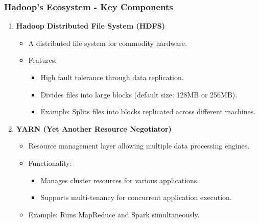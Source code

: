 \documentclass[aspectratio=169]{beamer}
\begin{document}
\begin{frame}[fragile]
    \frametitle{Hadoop's Ecosystem - Key Components}
    \begin{enumerate}
        \item \textbf{Hadoop Distributed File System (HDFS)}
        \begin{itemize}
            \item A distributed file system for commodity hardware.
            \item Features:
                \begin{itemize}
                    \item High fault tolerance through data replication.
                    \item Divides files into large blocks (default size: 128MB or 256MB).
                    \item Example: Splits files into blocks replicated across different machines.
                \end{itemize}
        \end{itemize}
        
        \item \textbf{YARN (Yet Another Resource Negotiator)}
        \begin{itemize}
            \item Resource management layer allowing multiple data processing engines.
            \item Functionality:
                \begin{itemize}
                    \item Manages cluster resources for various applications.
                    \item Supports multi-tenancy for concurrent application execution.
                \end{itemize}
            \item Example: Runs MapReduce and Spark simultaneously.
        \end{itemize}
    \end{enumerate}
\end{frame}
\end{document}
